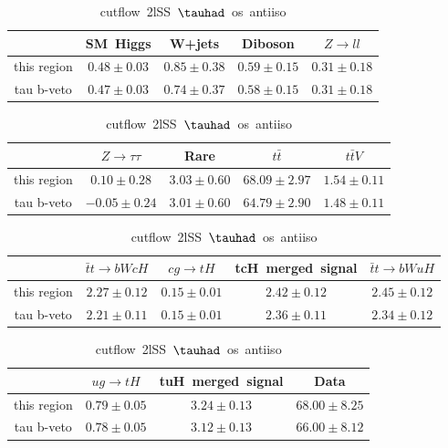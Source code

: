 \begin{table}
\footnotesize
\caption{cutflow~2lSS~$\tauhad$~os~antiiso}
\centering
\begin{tabular}{|c|c|c|c|c|} \hline
 & SM~Higgs & W+jets & Diboson & $Z\to ll$\\\hline
this region & $0.48\pm0.03$ & $0.85\pm0.38$ & $0.59\pm0.15$ & $0.31\pm0.18$\\\hline
tau b-veto & $0.47\pm0.03$ & $0.74\pm0.37$ & $0.58\pm0.15$ & $0.31\pm0.18$\\\hline
\end{tabular}
\begin{tabular}{|c|c|c|c|c|} \hline
 & $Z\to \tau\tau$ & Rare & $t\bar{t}$ & $t\bar{t}V$\\\hline
this region & $0.10\pm0.28$ & $3.03\pm0.60$ & $68.09\pm2.97$ & $1.54\pm0.11$\\\hline
tau b-veto & $-0.05\pm0.24$ & $3.01\pm0.60$ & $64.79\pm2.90$ & $1.48\pm0.11$\\\hline
\end{tabular}
\begin{tabular}{|c|c|c|c|c|} \hline
 & $\bar{t}t\to bWcH$ & $cg\to tH$ & tcH~merged~signal & $\bar{t}t\to bWuH$\\\hline
this region & $2.27\pm0.12$ & $0.15\pm0.01$ & $2.42\pm0.12$ & $2.45\pm0.12$\\\hline
tau b-veto & $2.21\pm0.11$ & $0.15\pm0.01$ & $2.36\pm0.11$ & $2.34\pm0.12$\\\hline
\end{tabular}
\begin{tabular}{|c|c|c|c|} \hline
 & $ug\to tH$ & tuH~merged~signal & Data\\\hline
this region & $0.79\pm0.05$ & $3.24\pm0.13$ & $68.00\pm8.25$\\\hline
tau b-veto & $0.78\pm0.05$ & $3.12\pm0.13$ & $66.00\pm8.12$\\\hline
\end{tabular}
\label{tab:cutflow_reg2lSS1tau1bnj_os_antiiso}
\end{table}
